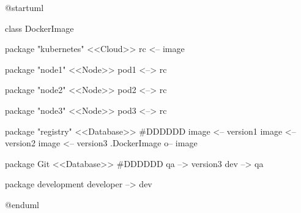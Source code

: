 @startuml

class DockerImage

package "kubernetes" <<Cloud>> {
  rc <-- image
}

package "node1" <<Node>> {
  pod1 <--> rc
}

package "node2" <<Node>> {
  pod2 <--> rc
}

package "node3" <<Node>> {
  pod3 <--> rc
}

package "registry" <<Database>> #DDDDDD {
  image <-- version1
  image <-- version2
  image <-- version3
  .DockerImage o-- image
}

package Git <<Database>> #DDDDDD {
  qa --> version3
  dev --> qa
}

package  development {
  developer --> dev
}


@enduml
